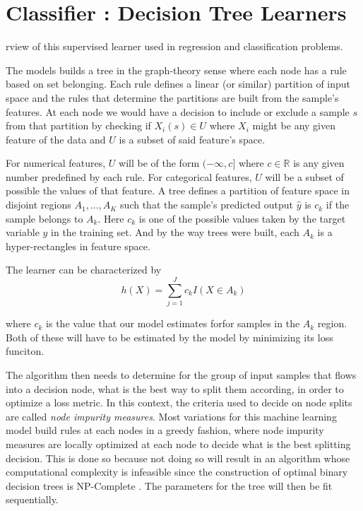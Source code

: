 \section{Classifier : Decision Tree Learners}

rview of this supervised learner used in regression and classification problems.

The models builds a tree in the graph-theory sense where each node has a rule based on set belonging. Each rule defines a linear (or similar) partition of input space and the rules that determine the partitions are built from the sample's features. At each node we would have a decision to include or exclude a sample $s$ from that partition by checking if $X_i(s) \in U$ where $X_i$ might be any given feature of the data and $U$ is a subset of said feature's space.

For numerical features, $U$ will be of the form $(-\infty,c]$ where $c \in \mathbb{R}$ is any given number predefined by each rule. For categorical features, $U$ will be a subset of possible the values of that feature. A tree defines a partition of feature space in disjoint regions $A_1,...,A_K$ such that the sample's predicted output $\hat{y}$ is $c_k$ if the sample belongs to $A_k$. Here $c_k$ is one of the possible values taken by the target variable $y$ in the training set. And by the way trees were built, each $A_k$ is a hyper-rectangles in feature space.

The learner can be characterized by 
\[
h(X) = \sum_{j=1}^J c_k I(X \in A_k)
\]\label{equation-decisionTreeModel}

where $c_k$ is the value that our model estimates forfor samples in the $A_k$ region. Both of these will have to be estimated by the model by minimizing its loss funciton.

The algorithm then needs to determine for the group of input samples that flows into a decision node, what is the best way to split them according, in order to optimize a loss metric. In this context, the criteria used to decide on node splits are called \textit{node impurity measures}. Most variations for this machine learning model build rules at each nodes in a greedy fashion, where node impurity measures are locally optimized at each node to decide what is the best splitting decision. This is done so because not doing so will result in an algorithm whose computational complexity is infeasible since the construction of optimal binary decision trees is NP-Complete \cite{decisionTreesNP}. The parameters for the tree will then be fit sequentially.

